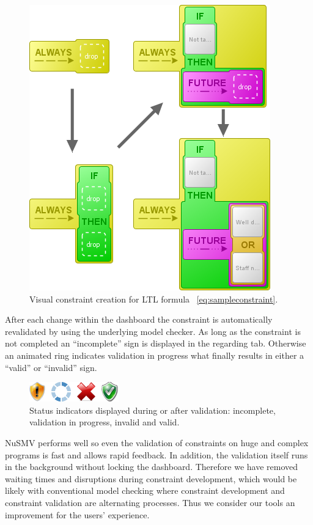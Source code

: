 \documentclass[conference]{IEEEtran}
\begin{document}
\begin{figure}[htbp]
  \centering
  \includegraphics[scale=0.5]{sampleconstraint}
  \caption{Visual constraint creation for LTL formula ~\ref{eq:sampleconstraint}.}
  \label{fig:sampleconstraint}
\end{figure}

After each change within the dashboard the constraint is automatically revalidated by using the underlying model checker. As long as the constraint is not completed an ``incomplete'' sign is displayed in the regarding tab. Otherwise an animated ring indicates validation in progress what finally results in either a ``valid'' or ``invalid'' sign.

\begin{figure}[htbp]
  \centering
  \includegraphics[scale=0.5]{results}
  \caption{Status indicators displayed during or after validation: incomplete, validation in progress, invalid and valid.}
  \label{fig:results}
\end{figure}

NuSMV performs well so even the validation of constraints on huge and complex programs is fast and allows rapid feedback. In addition, the validation itself runs in the background without locking the dashboard. Therefore we have removed waiting times and disruptions during constraint development, which would be likely with conventional model checking where constraint development and constraint validation are alternating processes. Thus we consider our tools an improvement for the users' experience.
\end{document}
